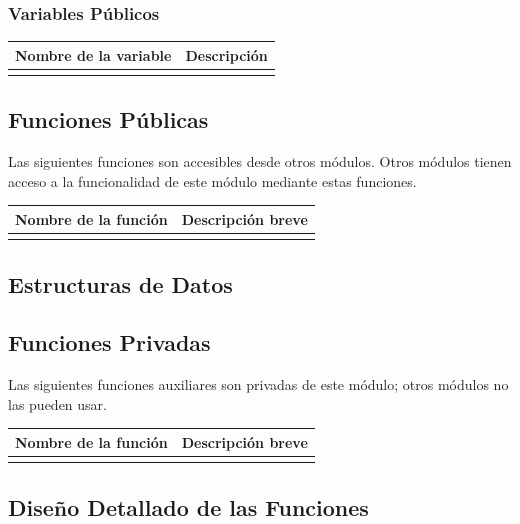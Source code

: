 \documentclass[a4paper,10pt]{article}
\begin{document}
\subsubsection{Variables Públicos}
\begin{tabular}{| p{30mm} | p{10cm} |}
        \hline
        \textbf{Nombre de la \mbox{variable}} & \textbf{Descripción} \\
        \hline
         & \\
        \hline
\end{tabular}
\subsection{Funciones Públicas}
Las siguientes funciones son accesibles desde otros módulos. Otros módulos
tienen acceso a la funcionalidad de este módulo mediante estas funciones.
~\\

\begin{tabular}{| p{30mm} | p{10cm} |}
        \hline
        \textbf{Nombre de la \mbox{función}} & \textbf{Descripción breve} \\
        \hline
         & \\
        \hline
\end{tabular}
\subsection{Estructuras de Datos}
\subsection{Funciones Privadas}
Las siguientes funciones auxiliares son privadas de este módulo; otros módulos
no las pueden usar.
~\\

\begin{tabular}{| p{30mm} | p{10cm} |}
        \hline
        \textbf{Nombre de la \mbox{función}} & \textbf{Descripción breve} \\
        \hline
         & \\
        \hline
\end{tabular}
\subsection{Diseño Detallado de las Funciones}
\end{document}
